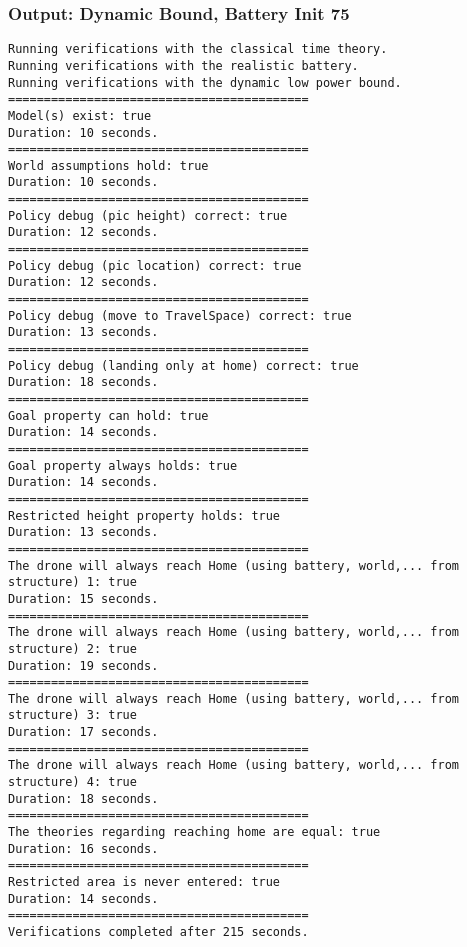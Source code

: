 \documentclass[12pt]{extarticle}
\begin{document}
\subsubsection*{Output: Dynamic Bound, Battery Init 75}
\begin{lstlisting}[basicstyle=\tiny]
Running verifications with the classical time theory.
Running verifications with the realistic battery.
Running verifications with the dynamic low power bound.
==========================================
Model(s) exist: true
Duration: 10 seconds.
==========================================
World assumptions hold: true
Duration: 10 seconds.
==========================================
Policy debug (pic height) correct: true
Duration: 12 seconds.
==========================================
Policy debug (pic location) correct: true
Duration: 12 seconds.
==========================================
Policy debug (move to TravelSpace) correct: true
Duration: 13 seconds.
==========================================
Policy debug (landing only at home) correct: true
Duration: 18 seconds.
==========================================
Goal property can hold: true
Duration: 14 seconds.
==========================================
Goal property always holds: true
Duration: 14 seconds.
==========================================
Restricted height property holds: true
Duration: 13 seconds.
==========================================
The drone will always reach Home (using battery, world,... from structure) 1: true
Duration: 15 seconds.
==========================================
The drone will always reach Home (using battery, world,... from structure) 2: true
Duration: 19 seconds.
==========================================
The drone will always reach Home (using battery, world,... from structure) 3: true
Duration: 17 seconds.
==========================================
The drone will always reach Home (using battery, world,... from structure) 4: true
Duration: 18 seconds.
==========================================
The theories regarding reaching home are equal: true
Duration: 16 seconds.
==========================================
Restricted area is never entered: true
Duration: 14 seconds.
==========================================
Verifications completed after 215 seconds.
\end{lstlisting}
\end{document}

